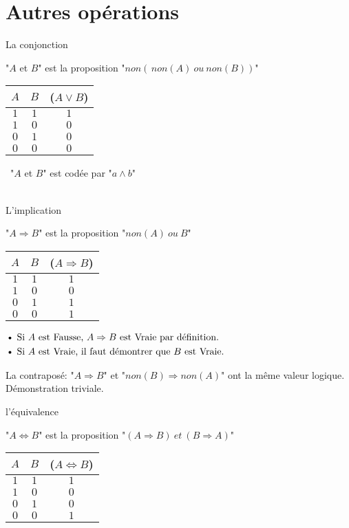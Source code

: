 \documentclass[12pt,twoside,a4paper]{article}
\begin{document}
	\section{Autres op\'erations}
		\begin{liste}
			\item La conjonction
				\begin{defi}"$A$ et $B$" est la proposition "$non(\,non(A)\ ou\ non(B))$"\end{defi}
				\begin{tabular}{ c | c | c  }
					$A$ & $B$ &($A\vee B$)\\\hline 
					$1$&$1$&$1$\\
					$1$&$0$&$0$\\
					$0$&$1$&$0$\\
					$0$&$0$&$0$\\
				\end{tabular} \textbullet\ "$A$ et $B$" est cod\'ee par "$a\land b$"\\\\
			\item L'implication 
				\begin{defi}"$A\Rightarrow B$" est la proposition "$non(A)\ ou\ B$"\end{defi}
				\begin{tabular}{ c | c | c  }
					$A$ & $B$ &($A\Rightarrow B$)\\\hline 
					$1$&$1$&$1$\\
					$1$&$0$&$0$\\
					$0$&$1$&$1$\\
					$0$&$0$&$1$\\
				\end{tabular}
				$\begin{aligned}
					&\text{\textbullet}\ \text{Si }A\text{ est Fausse, }A\Rightarrow B\text{ est Vraie par d\'efinition.}\\
					&\text{\textbullet}\ \text{Si }A\text{ est Vraie, il faut d\'emontrer que }B\text{ est Vraie.}
				\end{aligned}$
			\item La contrapos\'e: "$A\Rightarrow B$" et "$non(B)\Rightarrow non(A)$" ont la m\^eme valeur logique.\\
				D\'emonstration triviale.\\
			\item l'\'equivalence
				\begin{defi}"$A\Leftrightarrow B$" est la proposition "$(A\Rightarrow B)\ et\ (B\Rightarrow A)$" \end{defi}
				\begin{tabular}{ c | c | c  }
					$A$ & $B$ &($A\Leftrightarrow B$)\\\hline 
					$1$&$1$&$1$\\
					$1$&$0$&$0$\\
					$0$&$1$&$0$\\
					$0$&$0$&$1$\\
				\end{tabular}
		\end{liste}
\end{document}
